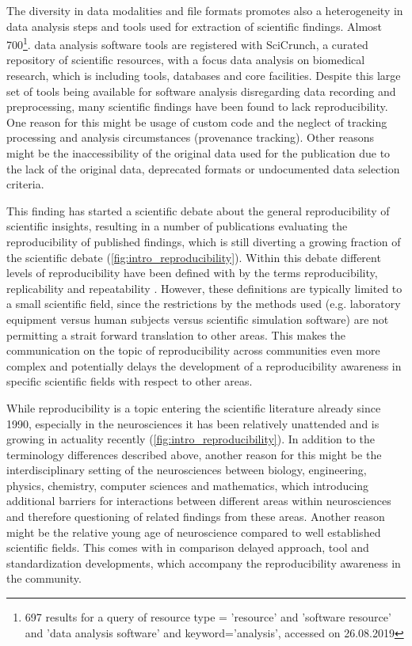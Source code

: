 The diversity in data modalities and file formats promotes also a heterogeneity in data analysis steps and tools used for extraction of scientific findings. Almost 700\footnote{697 results for a query of resource type = 'resource' and 'software resource' and 'data analysis software' and keyword='analysis', accessed on 26.08.2019}. data analysis software tools are registered with SciCrunch, a curated repository of scientific resources, with a focus data analysis on biomedical research, which is including tools, databases and core facilities. Despite this large set of tools being available for software analysis disregarding data recording and preprocessing, many scientific findings have been found to lack reproducibility. One reason for this might be usage of custom code and the neglect of tracking processing and analysis circumstances (provenance tracking). Other reasons might be the inaccessibility of the original data used for the publication due to the lack of the original data, deprecated formats or undocumented data selection criteria.

This finding has started a scientific debate about the general reproducibility of scientific insights, resulting in a number of publications evaluating the reproducibility of published findings, which is still diverting a growing fraction of the scientific debate (\cref{fig:intro_reproducibility}). Within this debate different levels of reproducibility have been defined with by the terms reproducibility, replicability and repeatability \citep{Plesser_2018}. However, these definitions are typically limited to a small scientific field, since the restrictions by the methods used (e.g. laboratory equipment versus human subjects versus scientific simulation software) are not permitting a strait forward translation to other areas. This makes the communication on the topic of reproducibility across communities even more complex and potentially delays the development of a reproducibility awareness in specific scientific fields with respect to other areas.

While reproducibility is a topic entering the scientific literature already since 1990, especially in the neurosciences it has been relatively unattended and is growing in actuality recently (\cref{fig:intro_reproducibility}). In addition to the terminology differences described above, another reason for this might be the interdisciplinary setting of the neurosciences between biology, engineering, physics, chemistry, computer sciences and mathematics, which introducing additional barriers for interactions between different areas within neurosciences and therefore questioning of related findings from these areas. Another reason might be the relative young age of neuroscience compared to well established scientific fields. This comes with in comparison delayed approach, tool and standardization developments, which accompany the reproducibility awareness in the community.

